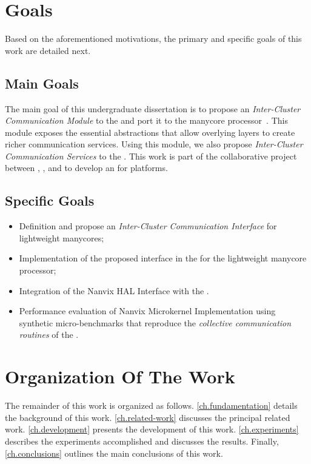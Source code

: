 \section{Goals}
\label{sec.goals}

	Based on the aforementioned motivations, the primary and specific
	goals of this work are detailed next.

\subsection{Main Goals}
\label{sec.goals.main}

	The main goal of this undergraduate dissertation is to propose an
	\textit{Inter-Cluster Communication Module} to the \nanvix
	\textit{\hal} and port it to the \mppa manycore
	processor~\cite{DeDinechin2013-1}. This module exposes the
	essential abstractions that allow overlying layers to create richer
	communication services. Using this module, we also
	propose \textit{Inter-Cluster Communication Services} to the \nanvix
	\microkernel. This work is part of the collaborative project between
	\ufsc, \pucminas, and \uga to develop an \os for \lightweight \manycore platforms.

\subsection{Specific Goals}
\label{sec.goals.specific}

	\begin{itemize}
		\item Definition and propose an \textit{Inter-Cluster Communication Interface} for lightweight manycores;

		\item Implementation of the proposed interface in the \nanvix \hal for the \mppa lightweight manycore processor;
        
		\item Integration of the Nanvix HAL Interface with the \nanvix \microkernel.
		
		\item Performance evaluation of Nanvix Microkernel Implementation using synthetic micro-benchmarks that reproduce the \textit{collective communication routines} of the \mpi.
	\end{itemize}

\section{Organization Of The Work}
\label{sec.organization}
	
	The remainder of this work is organized as follows.
	\autoref{ch.fundamentation} details the background of this work.
	\autoref{ch.related-work} discusses the principal related work.
	\autoref{ch.development} presents the development of this work.
	\autoref{ch.experiments} describes the experiments accomplished and
	discusses the results. Finally, \autoref{ch.conclusions} outlines
	the main conclusions of this work.
